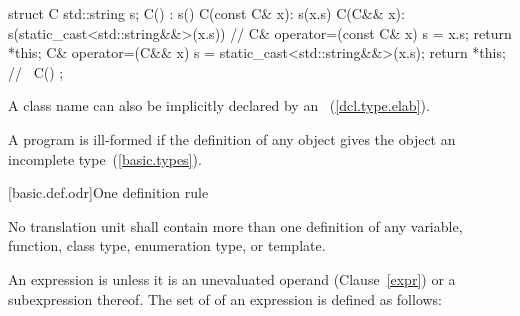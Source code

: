 \begin{codeblock}
struct C {
  std::string s;
  C() : s() { }
  C(const C& x): s(x.s) { }
  C(C&& x): s(static_cast<std::string&&>(x.s)) { }
    // 
  C& operator=(const C& x) { s = x.s; return *this; }
  C& operator=(C&& x) { s = static_cast<std::string&&>(x.s); return *this; }
    // 
  ~C() { }
};
\end{codeblock}
\exitexample

\pnum
\enternote A class name can also be implicitly declared by an
~(\ref{dcl.type.elab}).
\exitnote

\pnum
{}%
A program is ill-formed if the definition of any object gives the object
an incomplete type~(\ref{basic.types}).

%
%
%
%
%
[basic.def.odr]{One definition rule}

\pnum
No translation unit shall contain more than one definition of any
variable, function, class type, enumeration type, or template.

\pnum
An expression is  unless it is an
unevaluated operand (Clause~\ref{expr}) or a subexpression thereof.
The set of  of an expression  is
defined as follows:

